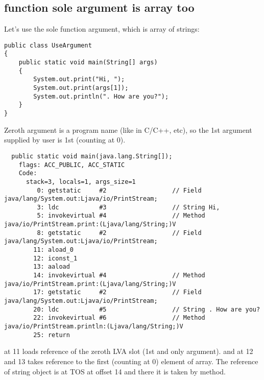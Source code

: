 \subsection{ function sole argument is array too}

Let's use the sole  function argument, which is array of strings:

\begin{lstlisting}
public class UseArgument
{
	public static void main(String[] args)
	{
		System.out.print("Hi, ");
		System.out.print(args[1]);
		System.out.println(". How are you?");
	}
}
\end{lstlisting}

Zeroth argument is a program name (like in C/C++, etc), 
so the 1st argument supplied by user is 1st (counting at 0).

\begin{lstlisting}
  public static void main(java.lang.String[]);
    flags: ACC_PUBLIC, ACC_STATIC
    Code:
      stack=3, locals=1, args_size=1
         0: getstatic     #2                  // Field java/lang/System.out:Ljava/io/PrintStream;
         3: ldc           #3                  // String Hi, 
         5: invokevirtual #4                  // Method java/io/PrintStream.print:(Ljava/lang/String;)V
         8: getstatic     #2                  // Field java/lang/System.out:Ljava/io/PrintStream;
        11: aload_0       
        12: iconst_1      
        13: aaload        
        14: invokevirtual #4                  // Method java/io/PrintStream.print:(Ljava/lang/String;)V
        17: getstatic     #2                  // Field java/lang/System.out:Ljava/io/PrintStream;
        20: ldc           #5                  // String . How are you?
        22: invokevirtual #6                  // Method java/io/PrintStream.println:(Ljava/lang/String;)V
        25: return        
\end{lstlisting}

 at 11 loads reference of the zeroth \ac{LVA} slot (1st and only  argument).
 and  at 12 and 13 takes reference to the first (counting at 0) element of array.
The reference of string object is at TOS at offset 14 and there it is taken by  method.
